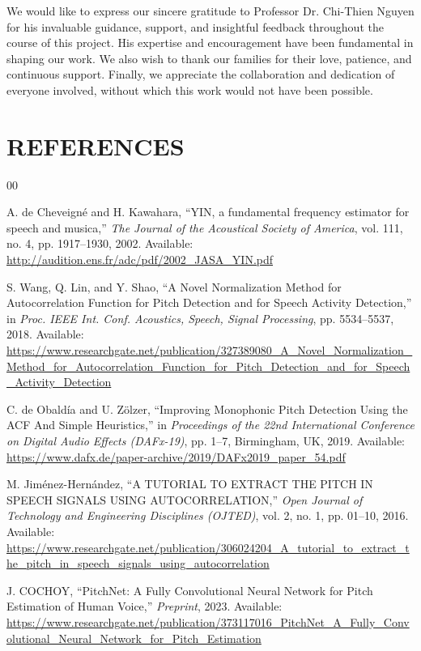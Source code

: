 \documentclass{ieeeaccess}
\begin{document}
We would like to express our sincere gratitude to Professor Dr. Chi-Thien Nguyen for his invaluable guidance, support, and insightful feedback throughout the course of this project. His expertise and encouragement have been fundamental in shaping our work. We also wish to thank our families for their love, patience, and continuous support. Finally, we appreciate the collaboration and dedication of everyone involved, without which this work would not have been possible.

\section{REFERENCES}

\renewcommand{\refname}{} %

\begin{thebibliography}{00}

 A. de Cheveigné and H. Kawahara, ``YIN, a fundamental frequency estimator for speech and musica,'' \emph{The Journal of the Acoustical Society of America}, vol. 111, no. 4, pp. 1917--1930, 2002.
Available: \url{http://audition.ens.fr/adc/pdf/2002_JASA_YIN.pdf}

 S. Wang, Q. Lin, and Y. Shao, ``A Novel Normalization Method for Autocorrelation Function for Pitch Detection and for Speech Activity Detection,'' in \emph{Proc. IEEE Int. Conf. Acoustics, Speech, Signal Processing}, pp. 5534--5537, 2018.
Available: \url{https://www.researchgate.net/publication/327389080_A_Novel_Normalization_Method_for_Autocorrelation_Function_for_Pitch_Detection_and_for_Speech_Activity_Detection}

 C. de Obaldía and U. Zölzer, ``Improving Monophonic Pitch Detection Using the ACF And Simple Heuristics,'' in \emph{Proceedings of the 22nd International Conference on Digital Audio Effects (DAFx-19)}, pp. 1--7, Birmingham, UK, 2019.
Available: \url{https://www.dafx.de/paper-archive/2019/DAFx2019_paper_54.pdf}

 M. Jiménez-Hernández, ``A TUTORIAL TO EXTRACT THE PITCH IN SPEECH SIGNALS USING AUTOCORRELATION,'' \emph{Open Journal of Technology and Engineering Disciplines (OJTED)}, vol. 2, no. 1, pp. 01--10, 2016.
Available: \url{https://www.researchgate.net/publication/306024204_A_tutorial_to_extract_the_pitch_in_speech_signals_using_autocorrelation}

 J. COCHOY, ``PitchNet: A Fully Convolutional Neural Network for Pitch Estimation of Human Voice,'' \emph{Preprint}, 2023.
Available: \url{https://www.researchgate.net/publication/373117016_PitchNet_A_Fully_Convolutional_Neural_Network_for_Pitch_Estimation}


\end{thebibliography}
\end{document}
